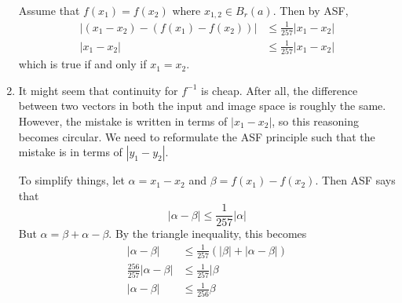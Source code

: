 \documentclass{article}
\begin{document}
\begin{enumerate}
          Assume that $f(x_1)=f(x_2)$ where $x_{1,2} \in B_r(a).$ Then by ASF,
          \begin{align}
              |(x_1-x_2)-(f(x_1)-f(x_2))| & \le \frac{1}{257}|x_1-x_2| \\
              |x_1-x_2|                   & \le \frac{1}{257}|x_1-x_2|
          \end{align}
          which is true if and only if $x_1=x_2.$

    \item It might seem that continuity for $f^{-1}$ is cheap. After all, the difference between two vectors in both the input and image space is roughly the same. However, the mistake is written in terms of $|x_1-x_2|$, so this reasoning becomes circular. We need to reformulate the ASF principle such that the mistake is in terms of $|y_1-y_2|.$

          To simplify things, let $\alpha=x_1-x_2$ and $\beta=f(x_1)-f(x_2).$ Then ASF says that
          \begin{equation}
              |\alpha-\beta | \le \frac{1}{257}|\alpha|
          \end{equation}
          But $\alpha = \beta + \alpha - \beta$. By the triangle inequality, this becomes
          \begin{align}
              |\alpha-\beta |               & \le \frac{1}{257}(|\beta|+|\alpha-\beta|) \\
              \frac{256}{257}|\alpha-\beta| & \le \frac{1}{257}|\beta                   \\
              |\alpha-\beta|                & \le \frac{1}{256}\beta
          \end{align}


\end{enumerate}
\end{document}
